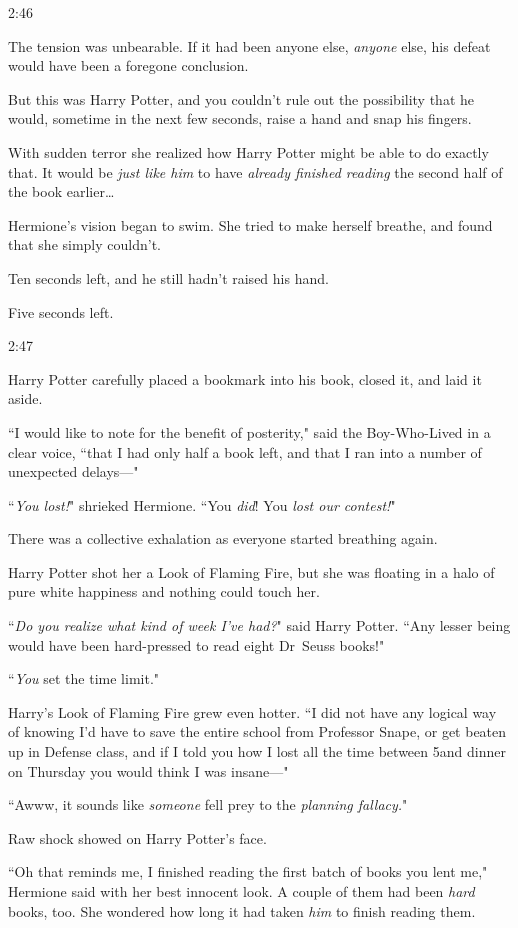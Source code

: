 2:46\pm

The tension was unbearable. If it had been anyone else, \emph{anyone} else, his defeat would have been a foregone conclusion.

But this was Harry Potter, and you couldn't rule out the possibility that he would, sometime in the next few seconds, raise a hand and snap his fingers.

With sudden terror she realized how Harry Potter might be able to do exactly that. It would be \emph{just like him} to have \emph{already finished reading} the second half of the book earlier{\ldots}

Hermione's vision began to swim. She tried to make herself breathe, and found that she simply couldn't.

Ten seconds left, and he still hadn't raised his hand.

Five seconds left.

2:47\pm

Harry Potter carefully placed a bookmark into his book, closed it, and laid it aside.

``I would like to note for the benefit of posterity," said the Boy-Who-Lived in a clear voice, ``that I had only half a book left, and that I ran into a number of unexpected delays—"

``\emph{You lost!}" shrieked Hermione. ``You \emph{did}! You \emph{lost our contest!}"

There was a collective exhalation as everyone started breathing again.

Harry Potter shot her a Look of Flaming Fire, but she was floating in a halo of pure white happiness and nothing could touch her.

``\emph{Do you realize what kind of week I've had?}" said Harry Potter. ``Any lesser being would have been hard-pressed to read eight Dr~Seuss books!"

``\emph{You} set the time limit."

Harry's Look of Flaming Fire grew even hotter. ``I did not have any logical way of knowing I'd have to save the entire school from Professor Snape, or get beaten up in Defense class, and if I told you how I lost all the time between 5\pm and dinner on Thursday you would think I was insane—"

``Awww, it sounds like \emph{someone} fell prey to the \emph{planning fallacy.}"

Raw shock showed on Harry Potter's face.

``Oh that reminds me, I finished reading the first batch of books you lent me," Hermione said with her best innocent look. A couple of them had been \emph{hard} books, too. She wondered how long it had taken \emph{him} to finish reading them.

